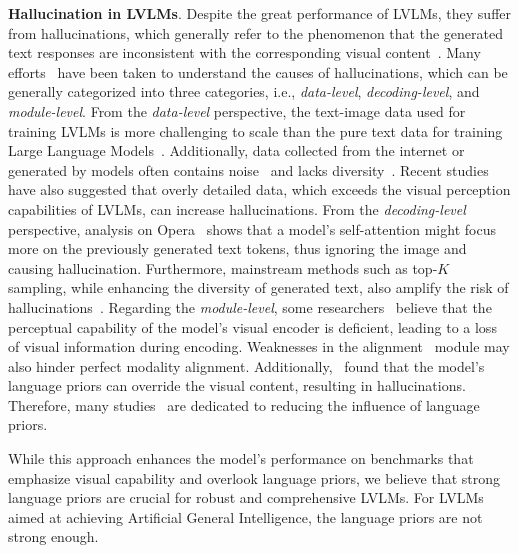 \noindent\textbf{Hallucination in LVLMs}. Despite the great performance of LVLMs, they suffer from hallucinations, which generally refer to the phenomenon that the generated text responses are inconsistent with the corresponding visual content~\citep{bai2024hallucination}. Many efforts~\citep{yu2024rlhf,han2024skip,sun2023aligning,liu2023improved,liu2023mitigating,zhai2023halle,chen2023mitigating,yue2024less,huang2023opera,wang2023evaluation,tong2024eyes,jiang2023hallucination,leng2023mitigating,yin2023woodpecker,zhang2024reflective,chen2024ict} have been taken to understand the causes of hallucinations, which can be generally categorized into three categories, i.e., \textit{data-level}, \textit{decoding-level}, and \textit{module-level}. From the \textit{data-level} perspective, the text-image data used for training LVLMs is more challenging to scale than the pure text data for training Large Language Models~\citep{sun2023aligning}. Additionally, data collected from the internet or generated by models often contains noise~\citep{liu2023improved} and lacks diversity~\citep{liu2023mitigating}. Recent studies~\citep{zhai2023halle,chen2023mitigating,yue2024less} have also suggested that overly detailed data, which exceeds the visual perception capabilities of LVLMs, can increase hallucinations. From the \textit{decoding-level} perspective, 
analysis on Opera~\citep{huang2023opera} shows that a model's self-attention might focus more on the previously generated text tokens, thus ignoring the image and causing hallucination. Furthermore, mainstream methods such as top-$K$ sampling, while enhancing the diversity of generated text, also amplify the risk of hallucinations~\citep{wang2023evaluation}. Regarding the \textit{module-level}, some researchers~\citep{tong2024eyes} believe that the perceptual capability of the model's visual encoder is deficient, leading to a loss of visual information during encoding. Weaknesses in the alignment~\citep{jiang2023hallucination} module may also hinder perfect modality alignment. Additionally,~\citet{leng2023mitigating} found that the model's language priors can override the visual content, resulting in hallucinations. Therefore, many studies~\citep{leng2023mitigating,chen2024halc,zhang2024debiasing,deng2024seeing,wu2024noiseboost,xiao2024seeing,sarkar2024mitigating,woo2024don,chen2024alleviating} are dedicated to reducing the influence of language priors. 


While this approach enhances the model's performance on benchmarks \citep{liu2023hallusionbench,tong2024eyes,LiDZWZW23} that emphasize visual capability and overlook language priors, we believe that strong language priors are crucial for robust and comprehensive LVLMs. For LVLMs aimed at achieving Artificial General Intelligence, the language priors are not strong enough.

